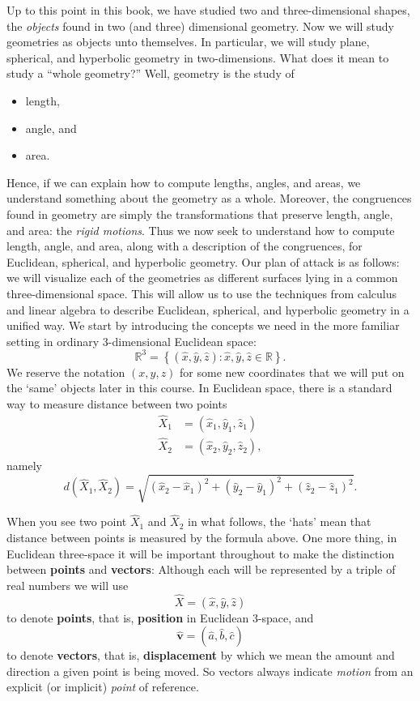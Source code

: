 \documentclass[newpage,hints,handout]{ximera}
\begin{document}
Up to this point in this book, we have studied two and three-dimensional shapes, the \textit{objects} found in two (and three) dimensional geometry. Now we will study geometries as objects unto themselves. In particular, we will study plane, spherical, and hyperbolic geometry in two-dimensions. What does it mean to study a ``whole geometry?'' Well, geometry is the study of 
\begin{itemize}
\item length,
\item angle, and
\item area.
\end{itemize}
Hence, if we can explain how to compute lengths, angles, and areas, we
understand something about the geometry as a whole. Moreover, the
congruences found in geometry are simply the transformations that
preserve length, angle, and area: the \textit{rigid motions}. Thus we
now seek to understand how to compute length, angle, and area, along
with a description of the congruences, for Euclidean, spherical, and
hyperbolic geometry.  Our plan of attack is as follows: we will
visualize each of the geometries as different surfaces lying in a
common three-dimensional space. This will allow us to use the
techniques from calculus and linear algebra to describe Euclidean,
spherical, and hyperbolic geometry in a unified way. We start by
introducing the concepts we need in the more familiar setting in
ordinary $3$-dimensional Euclidean space:
\[
\mathbb{R}^{3}=\left\{(\hat{x},\hat{y},\hat{z}):
\hat{x},\hat{y},\hat{z} \in \mathbb{R}\right\}.
\]
We reserve the notation $\left( x,y,z\right) $ for some new
coordinates that we will put on the `same' objects later in this
course. In Euclidean space, there is a standard way to measure
distance between two points%
\begin{align*}
\hat{X}_{1}  &  =(  \hat{x}_{1},\hat{y}_{1},\hat{z}_{1}) \\
\hat{X}_{2}  &  =(  \hat{x}_{2},\hat{y}_{2},\hat{z}_{2})  ,
\end{align*}
namely%
\[
d(\hat{X}_{1},\hat{X}_{2})=\sqrt{(\hat{x}_{2}-\hat{x}_{1})^{2}+
  (\hat{y}_{2}-\hat{y}_{1})^{2}+(\hat{z}_{2}-\hat{z}_{1})^{2}}. \label{0}%
\]

When you see two point $\hat{X}_1$ and $\hat{X}_2$ in what follows,
the `hats' mean that distance between points is measured by the
formula above. One more thing, in Euclidean three-space it will be
important throughout to make the distinction between \textbf{points}
and \textbf{vectors}: Although each will be represented by a triple of
real numbers we will use%
\[
\hat{X}=(\hat{x},\hat{y},\hat{z})
\]
to denote \textbf{points}, that is, \textbf{position} in Euclidean $3$-space,
and%
\[
\hat{\mathbf v}=(\hat{a},\hat{b},\hat{c})
\]
to denote \textbf{vectors}, that is, \textbf{displacement} by which we mean
the amount and direction a given point is being moved. So vectors always
indicate \textit{motion} from an explicit (or implicit) \textit{point} of
reference. 
\end{document}
